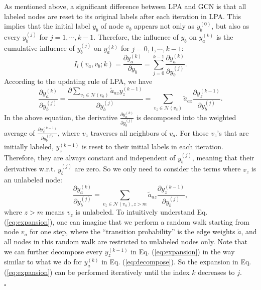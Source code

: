 \documentclass{article}
\newenvironment{proof}{{\noindent\it Proof.}\quad}{\hfill $\square$\par}
\begin{document}
		\begin{proof}
			As mentioned above, a significant difference between LPA and GCN is that all labeled nodes are reset to its original labels after each iteration in LPA.
			This implies that the initial label $y_b$ of node $v_b$ appears not only as $y_b^{(0)}$, but also as every $y_b^{(j)}$ for $j = 1,\cdots, k-1$.
			Therefore, the influence of $y_b$ on $y_a^{(k)}$ is the cumulative influence of $y_b^{(j)}$ on $y_a^{(k)}$ for $j = 0, 1,\cdots, k-1$:
			\begin{equation}
			\label{eq:appendix_1}
				I_l(v_a, v_b; k) = \frac{\partial y_a^{(k)}}{\partial y_b} = \sum_{j=0}^{k-1} \frac{\partial y_a^{(k)}}{\partial y_b^{(j)}}.
			\end{equation}
			According to the updating rule of LPA, we have
			\begin{equation}
			\label{eq:decompose}
				\frac{\partial y_a^{(k)}}{\partial y_b^{(j)}} = \frac{\partial \sum_{v_z \in \mathcal N(v_a)} \tilde a_{az} y_z^{(k-1)}}{\partial y_b^{(j)}} = \sum_{v_z \in \mathcal N(v_a)} \tilde a_{az} \frac{\partial y_z^{(k-1)}}{\partial y_b^{(j)}}.
			\end{equation}
			In the above equation, the derivative $\frac{\partial y_a^{(k)}}{\partial y_b^{(j)}}$ is decomposed into the weighted average of $\frac{\partial y_z^{(k-1)}}{\partial y_b^{(j)}}$, where $v_z$ traverses all neighbors of $v_a$.
			For those $v_z$'s that are initially labeled, $y_z^{(k-1)}$ is reset to their initial labels in each iteration.
			Therefore, they are always constant and independent of $y_b^{(j)}$, meaning that their derivatives w.r.t. $y_b^{(j)}$ are zero.
			So we only need to consider the terms where $v_z$ is an unlabeled node:
			\begin{equation}
			\label{eq:expansion}
				\frac{\partial y_a^{(k)}}{\partial y_b^{(j)}} = \sum_{v_z \in \mathcal N(v_a), z > m} \tilde a_{az} \frac{\partial y_z^{(k-1)}}{\partial y_b^{(j)}},
			\end{equation}
			where $z>m$ means $v_z$ is unlabeled.
			To intuitively understand Eq. (\ref{eq:expansion}), one can imagine that we perform a random walk starting from node $v_a$ for one step, where the ``transition probability'' is the edge weights $\tilde a$, and all nodes in this random walk are restricted to unlabeled nodes only.
			Note that we can further decompose every $y_z^{(k-1)}$ in Eq. (\ref{eq:expansion}) in the way similar to what we do for $y_a^{(k)}$ in Eq. (\ref{eq:decompose}).
			So the expansion in Eq. (\ref{eq:expansion}) can be performed iteratively until the index $k$ decreases to $j$.

\end{proof}
\end{document}
